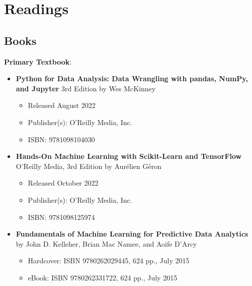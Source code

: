 \documentclass{article}
\begin{document}
\section{Readings}
\subsection{Books}
\textbf{Primary Textbook}:
  \begin{itemize}
    \item \textbf{Python for Data Analysis: Data Wrangling with pandas, NumPy, and Jupyter} 3rd Edition by Wes McKinney
    \begin{itemize}
        \item Released August 2022
        \item Publisher(s): O'Reilly Media, Inc.
        \item ISBN: 9781098104030
    \end{itemize}  
  \end{itemize}
  \begin{itemize}
  	\item \textbf{Hands-On Machine Learning with Scikit-Learn and TensorFlow} O'Reilly Media, 3rd Edition by Aurélien Géron
  	\begin{itemize}
        \item Released October 2022
        \item Publisher(s): O'Reilly Media, Inc.
        \item ISBN: 9781098125974
    \end{itemize}
  \end{itemize}
  \begin{itemize}
    \item \textbf{Fundamentals of Machine Learning for Predictive Data Analytics} by John D. Kelleher, Brian Mac Namee, and Aoife D’Arcy
    \begin{itemize}
        \item Hardcover: ISBN 9780262029445, 624 pp., July 2015
        \item eBook: ISBN 9780262331722, 624 pp., July 2015
    \end{itemize} 
  \end{itemize}
\end{document}
